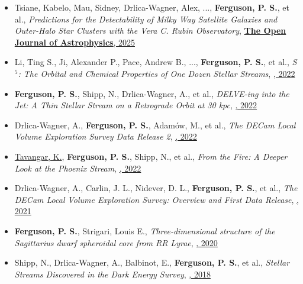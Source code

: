 \begin{itemize}[itemsep=1pt]
    \item {Tsiane}, Kabelo, {Mau}, Sidney, {Drlica-Wagner}, Alex, ..., \textbf{Ferguson, P. S.}, et al., \textit{{Predictions for the Detectability of Milky Way Satellite Galaxies and Outer-Halo Star Clusters with the Vera C. Rubin Observatory}}, \href{https://ui.adsabs.harvard.edu/abs/2025OJAp....8E..89T}{\textbf{The Open Journal of Astrophysics}, 2025}
    \item {Li}, Ting S., {Ji}, Alexander P., {Pace}, Andrew B., ..., \textbf{Ferguson, P. S.}, et al., \textit{{S $^{5}$: The Orbital and Chemical Properties of One Dozen Stellar Streams}}, \href{https://ui.adsabs.harvard.edu/abs/2022ApJ...928...30L}{\textbf{\apj}, 2022}
    \item \textbf{Ferguson, P. S.}, {Shipp}, N., {Drlica-Wagner}, A., et al., \textit{{DELVE-ing into the Jet: A Thin Stellar Stream on a Retrograde Orbit at 30 kpc}}, \href{https://ui.adsabs.harvard.edu/abs/2022AJ....163...18F}{\textbf{\aj}, 2022}
    \item {Drlica-Wagner}, A., \textbf{Ferguson, P. S.}, {Adam{\'o}w}, M., et al., \textit{{The DECam Local Volume Exploration Survey Data Release 2}}, \href{https://ui.adsabs.harvard.edu/abs/2022ApJS..261...38D}{\textbf{\apjs}, 2022}
    \item \underline{{Tavangar}, K.}, \textbf{Ferguson, P. S.}, {Shipp}, N., et al., \textit{{From the Fire: A Deeper Look at the Phoenix Stream}}, \href{https://ui.adsabs.harvard.edu/abs/2022ApJ...925..118T}{\textbf{\apj}, 2022}
    \item {Drlica-Wagner}, A., {Carlin}, J. L., {Nidever}, D. L., \textbf{Ferguson, P. S.}, et al., \textit{{The DECam Local Volume Exploration Survey: Overview and First Data Release}}, \href{https://ui.adsabs.harvard.edu/abs/2021ApJS..256....2D}{\textbf{\apjs}, 2021}
    \item \textbf{Ferguson, P. S.}, {Strigari}, Louis E., \textit{{Three-dimensional structure of the Sagittarius dwarf spheroidal core from RR Lyrae}}, \href{https://ui.adsabs.harvard.edu/abs/2020MNRAS.495.4124F}{\textbf{\mnras}, 2020}
    \item {Shipp}, N., {Drlica-Wagner}, A., {Balbinot}, E., \textbf{Ferguson, P. S.}, et al., \textit{{Stellar Streams Discovered in the Dark Energy Survey}}, \href{https://ui.adsabs.harvard.edu/abs/2018ApJ...862..114S}{\textbf{\apj}, 2018}
\end{itemize}
